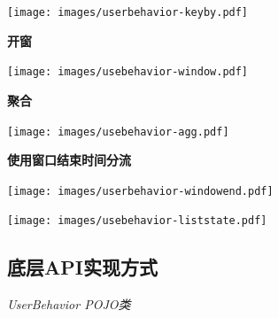 \documentclass[cn,11pt,chinese]{elegantbook}
\begin{document}
\texttt{[image: images/userbehavior-keyby.pdf]}

\textbf{开窗}

\texttt{[image: images/usebehavior-window.pdf]}

\textbf{聚合}

\texttt{[image: images/usebehavior-agg.pdf]}

\textbf{使用窗口结束时间分流}

\texttt{[image: images/userbehavior-windowend.pdf]}

\texttt{[image: images/usebehavior-liststate.pdf]}

\hypertarget{ux5e95ux5c42apiux5b9eux73b0ux65b9ux5f0f}{%
\subsection{底层API实现方式}\label{ux5e95ux5c42apiux5b9eux73b0ux65b9ux5f0f}}

\emph{UserBehavior POJO类}
\end{document}
